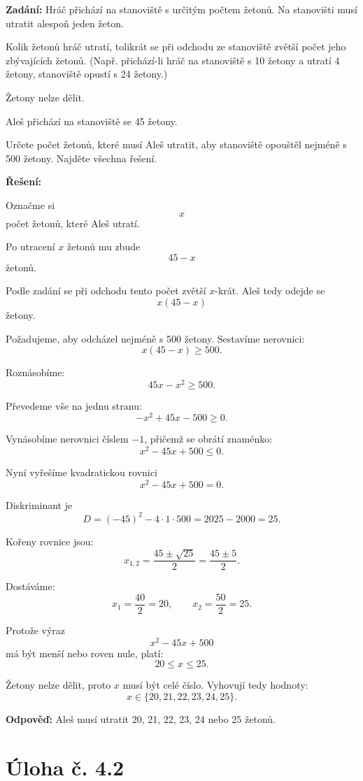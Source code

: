 \documentclass[12pt,a4paper]{article}
\begin{document}
\textbf{Zadání:}  
Hráč přichází na stanoviště s určitým počtem žetonů. Na stanovišti musí utratit alespoň jeden žeton.

Kolik žetonů hráč utratí, tolikrát se při odchodu ze stanoviště zvětší počet jeho zbývajících žetonů. (Např. přichází-li hráč na stanoviště s 10 žetony a utratí 4 žetony, stanoviště opustí s 24 žetony.)

Žetony nelze dělit.

Aleš přichází na stanoviště se 45 žetony.

Určete počet žetonů, které musí Aleš utratit, aby stanoviště opouštěl nejméně s 500 žetony. Najděte všechna řešení.

\bigskip

\textbf{Řešení:}

Označme si
\[
x
\]
počet žetonů, které Aleš utratí.

Po utracení \(x\) žetonů mu zbude
\[
45-x
\]
žetonů.

Podle zadání se při odchodu tento počet zvětší \(x\)-krát. Aleš tedy odejde se
\[
x(45-x)
\]
žetony.

Požadujeme, aby odcházel nejméně s 500 žetony. Sestavíme nerovnici:
\[
x(45-x)\geq 500.
\]

Roznásobíme:
\[
45x-x^2\geq 500.
\]

Převedeme vše na jednu stranu:
\[
-x^2+45x-500\geq 0.
\]

Vynásobíme nerovnici číslem \(-1\), přičemž se obrátí znaménko:
\[
x^2-45x+500\leq 0.
\]

Nyní vyřešíme kvadratickou rovnici
\[
x^2-45x+500=0.
\]

Diskriminant je
\[
D = (-45)^2-4\cdot 1\cdot 500 = 2025-2000=25.
\]

Kořeny rovnice jsou:
\[
x_{1,2}=\frac{45\pm \sqrt{25}}{2}=\frac{45\pm 5}{2}.
\]

Dostáváme:
\[
x_1=\frac{40}{2}=20,\qquad x_2=\frac{50}{2}=25.
\]

Protože výraz
\[
x^2-45x+500
\]
má být menší nebo roven nule, platí:
\[
20\leq x\leq 25.
\]

Žetony nelze dělit, proto \(x\) musí být celé číslo. Vyhovují tedy hodnoty:
\[
x\in\{20,21,22,23,24,25\}.
\]

\bigskip

\textbf{Odpověď:}  
Aleš musí utratit 20, 21, 22, 23, 24 nebo 25 žetonů.

\section*{Úloha č. 4.2}
\end{document}
